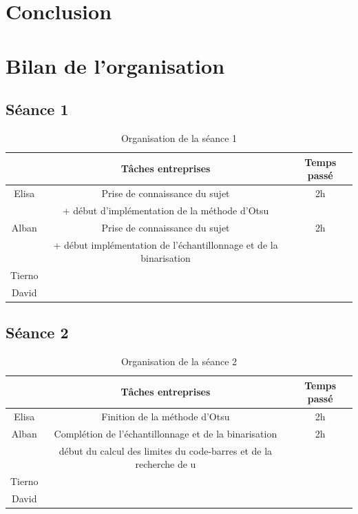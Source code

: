\documentclass{rapport}
\begin{document}
\section{Conclusion}

\section{Bilan de l'organisation}

\subsection{Séance 1}

\begin{table}[H]
	\centering 
	\begin{tabular}{c|c|c}
		& Tâches entreprises& Temps passé\\ \hline
		Elisa& Prise de connaissance du sujet & 2h\\
        & + début d'implémentation de la méthode d'Otsu & \\ \hline
		Alban& Prise de connaissance du sujet & 2h\\
        & + début implémentation de l'échantillonnage et de la binarisation & \\ \hline
		Tierno& & \\ \hline
		David& & 
	\end{tabular}
	\caption{Organisation de la séance 1}
\end{table}

\subsection{Séance 2}

\begin{table}[H]
	\centering 
	\begin{tabular}{c|c|c}
		& Tâches entreprises& Temps passé\\ \hline
		Elisa& Finition de la méthode d'Otsu & 2h\\ \hline
		Alban& Complétion de l'échantillonnage et de la binarisation& 2h\\
        &  début du calcul des limites du code-barres et de la recherche de u & \\ \hline
		Tierno& & \\ \hline
		David& & 
	\end{tabular}
	\caption{Organisation de la séance 2}
\end{table}
\end{document}
